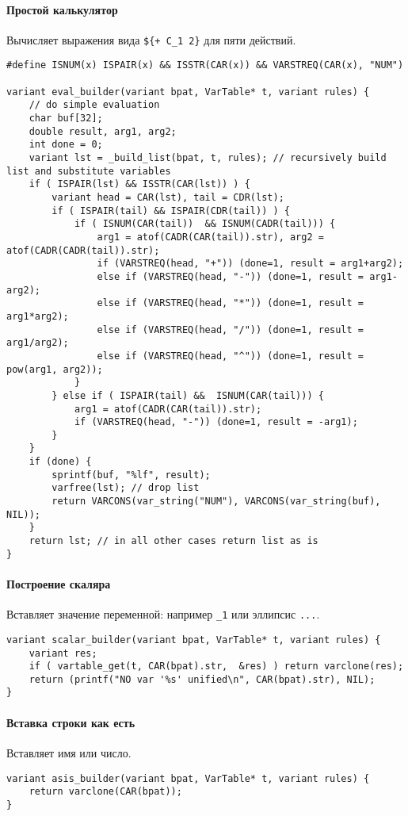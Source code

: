 \documentclass[10pt]{report}
\begin{document}
\paragraph{Простой калькулятор} Вычисляет выражения вида \verb|${+ C_1 2}| для пяти действий.
\begin{lstlisting}[firstnumber=35]
#define ISNUM(x) ISPAIR(x) && ISSTR(CAR(x)) && VARSTREQ(CAR(x), "NUM")

variant eval_builder(variant bpat, VarTable* t, variant rules) {
	// do simple evaluation
	char buf[32];
	double result, arg1, arg2;
	int done = 0;
	variant lst = _build_list(bpat, t, rules); // recursively build list and substitute variables
	if ( ISPAIR(lst) && ISSTR(CAR(lst)) ) { 
		variant head = CAR(lst), tail = CDR(lst);
		if ( ISPAIR(tail) && ISPAIR(CDR(tail)) ) {
			if ( ISNUM(CAR(tail))  && ISNUM(CADR(tail))) {
				arg1 = atof(CADR(CAR(tail)).str), arg2 = atof(CADR(CADR(tail)).str);
				if (VARSTREQ(head, "+")) (done=1, result = arg1+arg2);
				else if (VARSTREQ(head, "-")) (done=1, result = arg1-arg2);
				else if (VARSTREQ(head, "*")) (done=1, result = arg1*arg2);
				else if (VARSTREQ(head, "/")) (done=1, result = arg1/arg2);
				else if (VARSTREQ(head, "^")) (done=1, result = pow(arg1, arg2));
			}
		} else if ( ISPAIR(tail) &&  ISNUM(CAR(tail))) {
			arg1 = atof(CADR(CAR(tail)).str);
			if (VARSTREQ(head, "-")) (done=1, result = -arg1);
		}
	} 
	if (done) {
		sprintf(buf, "%lf", result);
		varfree(lst); // drop list
		return VARCONS(var_string("NUM"), VARCONS(var_string(buf), NIL));
	}
	return lst; // in all other cases return list as is
}
\end{lstlisting}
\paragraph{Построение скаляра} Вставляет значение переменной: например \verb|_1| или эллипсис \verb|...|.
\begin{lstlisting}[firstnumber=67]
variant scalar_builder(variant bpat, VarTable* t, variant rules) {
	variant res;
	if ( vartable_get(t, CAR(bpat).str,  &res) ) return varclone(res);
	return (printf("NO var '%s' unified\n", CAR(bpat).str), NIL);
}
\end{lstlisting}
\paragraph{Вставка строки как есть} Вставляет имя или число.
\begin{lstlisting}[firstnumber=73]
variant asis_builder(variant bpat, VarTable* t, variant rules) {
	return varclone(CAR(bpat));
}
\end{lstlisting}
\end{document}
